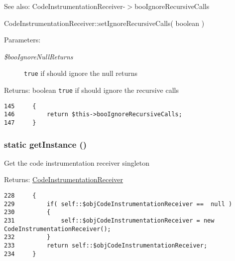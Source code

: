 \begin{Desc}
\item[See also:]CodeInstrumentationReceiver-$>$booIgnoreRecursiveCalls 

CodeInstrumentationReceiver::setIgnoreRecursiveCalls( boolean ) \end{Desc}
\begin{Desc}
\item[Parameters:]
\begin{description}
\item[{\em \$booIgnoreNullReturns}]{\tt true} if should ignore the null returns \end{description}
\end{Desc}
\begin{Desc}
\item[Returns:]boolean {\tt true} if should ignore the recursive calls \end{Desc}


\begin{Code}\begin{verbatim}145     {
146         return $this->booIgnoreRecursiveCalls;
147     }
\end{verbatim}
\end{Code}


\hypertarget{class_code_instrumentation_receiver_c93fbec81f07e5d15f80db907e63dc10}{
\subsubsection[{getInstance}]{\setlength{\rightskip}{0pt plus 5cm}static getInstance ()}}
\label{class_code_instrumentation_receiver_c93fbec81f07e5d15f80db907e63dc10}


Get the code instrumentation receiver singleton

\begin{Desc}
\item[Returns:]\hyperlink{class_code_instrumentation_receiver}{CodeInstrumentationReceiver} \end{Desc}


\begin{Code}\begin{verbatim}228     {
229         if( self::$objCodeInstrumentationReceiver ==  null )
230         {
231             self::$objCodeInstrumentationReceiver = new CodeInstrumentationReceiver();
232         }
233         return self::$objCodeInstrumentationReceiver;
234     }
\end{verbatim}
\end{Code}


